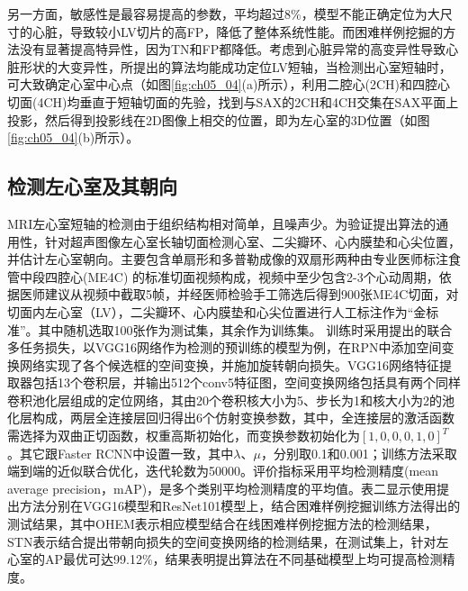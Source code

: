 另一方面，敏感性是最容易提高的参数，平均超过8\%，模型不能正确定位为大尺寸的心脏，导致较小LV切片的高FP，降低了整体系统性能。而困难样例挖掘的方法没有显著提高特异性，因为TN和FP都降低。考虑到心脏异常的高变异性导致心脏形状的大变异性，所提出的算法均能成功定位LV短轴，当检测出心室短轴时，可大致确定心室中心点（如图\ref{fig:ch05_04}(a)所示），利用二腔心(2CH)和四腔心切面(4CH)均垂直于短轴切面的先验，找到与SAX的2CH和4CH交集在SAX平面上投影，然后得到投影线在2D图像上相交的位置，即为左心室的3D位置（如图\ref{fig:ch05_04}(b)所示）。

\subsection{检测左心室及其朝向}

MRI左心室短轴的检测由于组织结构相对简单，且噪声少。为验证提出算法的通用性，针对超声图像左心室长轴切面检测心室、二尖瓣环、心内膜垫和心尖位置，并估计左心室朝向。主要包含单扇形和多普勒成像的双扇形两种由专业医师标注食管中段四腔心(ME4C) 的标准切面视频构成，视频中至少包含2-3个心动周期，依据医师建议从视频中截取5帧，并经医师检验手工筛选后得到900张ME4C切面，对切面内左心室（LV），二尖瓣环、心内膜垫和心尖位置进行人工标注作为“金标准”。其中随机选取100张作为测试集，其余作为训练集。
训练时采用提出的联合多任务损失，以VGG16网络作为检测的预训练的模型为例，在RPN中添加空间变换网络实现了各个候选框的空间变换，并施加旋转朝向损失。VGG16网络特征提取器包括13个卷积层，并输出512个conv5特征图，空间变换网络包括具有两个同样卷积池化层组成的定位网络，其由20个卷积核大小为5、步长为1和核大小为2的池化层构成，两层全连接层回归得出6个仿射变换参数，其中，全连接层的激活函数需选择为双曲正切函数，权重高斯初始化，而变换参数初始化为$[1, 0, 0, 0, 1, 0]^T$。其它跟Faster RCNN中设置一致，其中$\lambda$、$\mu$，分别取0.1和0.001；训练方法采取端到端的近似联合优化，迭代轮数为50000。评价指标采用平均检测精度(mean average precision，mAP)，是多个类别平均检测精度的平均值。表二显示使用提出方法分别在VGG16模型和ResNet101模型上，结合困难样例挖掘训练方法得出的测试结果，其中OHEM表示相应模型结合在线困难样例挖掘方法的检测结果，STN表示结合提出带朝向损失的空间变换网络的检测结果，在测试集上，针对左心室的AP最优可达99.12\%，结果表明提出算法在不同基础模型上均可提高检测精度。

